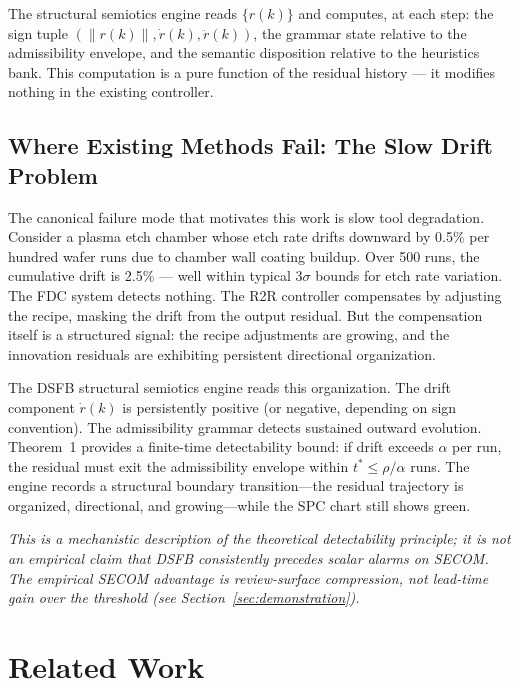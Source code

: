 \documentclass[11pt,letterpaper]{article}
\theoremstyle{scresult}
\newcommand{\norm}[1]{\left\|#1\right\|}
\begin{document}
The structural semiotics engine reads $\{r(k)\}$ and computes, at each step:
the sign tuple $(\norm{r(k)}, \dot{r}(k), \ddot{r}(k))$, the grammar state
relative to the admissibility envelope, and the semantic disposition relative
to the heuristics bank. This computation is a pure function of the residual
history --- it modifies nothing in the existing controller.

\subsection{Where Existing Methods Fail: The Slow Drift Problem}

The canonical failure mode that motivates this work is slow tool degradation.
Consider a plasma etch chamber whose etch rate drifts downward by 0.5\% per
hundred wafer runs due to chamber wall coating buildup. Over 500 runs, the
cumulative drift is 2.5\% --- well within typical $3\sigma$ bounds for etch
rate variation. The FDC system detects nothing. The R2R controller compensates
by adjusting the recipe, masking the drift from the output residual. But the
compensation itself is a structured signal: the recipe adjustments are growing,
and the innovation residuals are exhibiting persistent directional organization.

The DSFB structural semiotics engine reads this organization. The drift
component $\dot{r}(k)$ is persistently positive (or negative, depending on
sign convention). The admissibility grammar detects sustained outward evolution.
Theorem~1 provides a finite-time detectability bound: if drift exceeds $\alpha$
per run, the residual must exit the admissibility envelope within
$t^* \leq \rho/\alpha$ runs.
The engine records a structural boundary transition---the residual trajectory
is organized, directional, and growing---while the SPC chart still shows green.

\textit{This is a mechanistic description of the theoretical detectability
principle; it is not an empirical claim that DSFB consistently precedes scalar
alarms on SECOM. The empirical SECOM advantage is review-surface compression,
not lead-time gain over the threshold (see Section~\ref{sec:demonstration}).}

\section{Related Work}
\label{sec:related-work}
\end{document}

